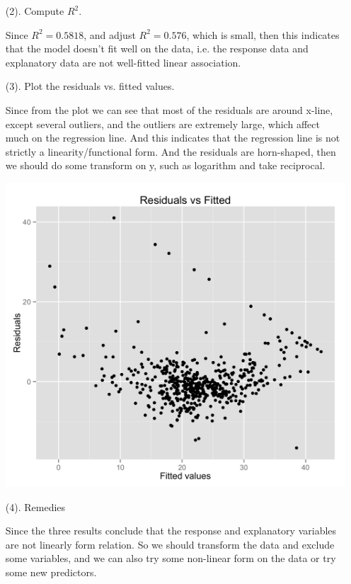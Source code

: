 \documentclass[10pt,letterpaper]{article}
\begin{document}
\begin{enumerate}[leftmargin=0cm,itemindent=.5cm,labelwidth=\itemindent,labelsep=0cm,align=left]
\begin{enumerate}[leftmargin=0cm,itemindent=.5cm,labelwidth=\itemindent,labelsep=0cm,align=left]
\begin{enumerate}[leftmargin=0cm,itemindent=.5cm,labelwidth=\itemindent,labelsep=0cm,align=left]
\item[(2). ] Compute $R^2$.

Since $R^2=0.5818$, and adjust $R^2 = 0.576$, which is small, then this indicates that the model doesn't fit well on the data, i.e. the response data and explanatory data are not well-fitted linear association. \\

\item[(3). ] Plot the residuals vs. fitted values. 

Since from the plot we can see that most of the residuals are around x-line, except several outliers, and the outliers are extremely large, which affect much on the regression line. And this indicates that the regression line is not strictly a linearity/functional form. And the residuals are horn-shaped, then we should do some transform on y, such as logarithm and take reciprocal. \\

\begin{center}
\includegraphics[scale=0.16]{resid}
\end{center}

\item[(4). ] Remedies 

Since the three results conclude that the response and explanatory variables are not linearly form relation. So we should transform the data and exclude some variables, and we can also try some non-linear form on the data or try some new predictors.
\end{enumerate}


\end{enumerate}
\end{enumerate}
\end{document}
